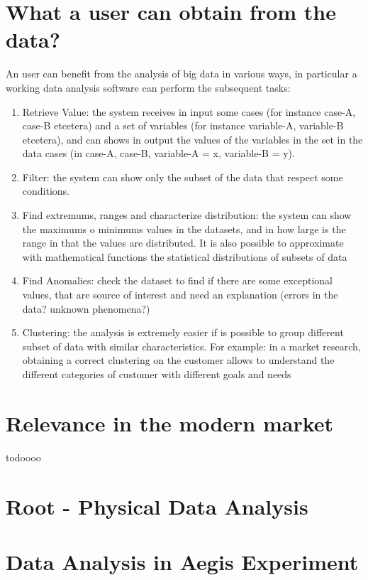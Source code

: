 \section{What a user can obtain from the data?}

An user can benefit from the analysis of big data in various ways, in particular a working data analysis software can perform the subsequent tasks:

\begin{enumerate}

\item Retrieve Value: the system receives in input some cases (for instance case-A, case-B etcetera) and a set of variables (for instance variable-A, variable-B etcetera), and can shows in output the values of the variables in the set in the data cases (in case-A, case-B, variable-A = x, variable-B = y).

\item Filter: the system can show only the subset of the data that respect some conditions.

\item Find extremums, ranges and characterize distribution: the system can show the maximums o minimums values in the datasets, and in how large is the range in that the values are distributed. It is also possible to approximate with mathematical functions the statistical distributions of subsets of data 

\item Find Anomalies: check the dataset to find if there are some exceptional values, that are source of interest and need an explanation (errors in the data? unknown phenomena?)

\item Clustering: the analysis is extremely easier if is possible to group different subset of data with similar characteristics. For example: in a market research, obtaining a correct clustering on the customer allows to understand the different categories of customer with different goals and needs      

\end{enumerate}

\section{Relevance in the modern market}

todoooo

\section{Root - Physical Data Analysis }

\section{Data Analysis in Aegis Experiment}

